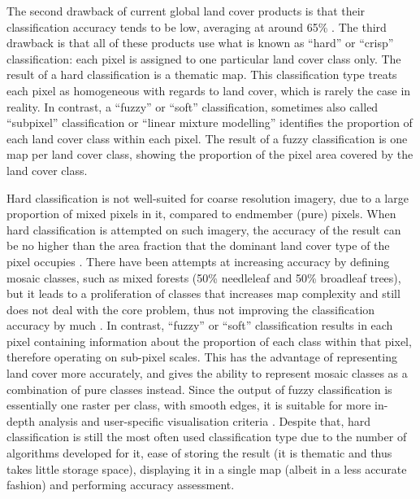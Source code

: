 \documentclass[a4paper,12pt]{scrbook}
\begin{document}
The second drawback of current global land cover products is that their classification accuracy tends to be low, averaging at around 65\% \citep{tsendbazar2016integrating}. The third drawback is that all of these products use what is known as ``hard'' or ``crisp'' classification: each pixel is assigned to one particular land cover class only. The result of a hard classification is a thematic map. This classification type treats each pixel as homogeneous with regards to land cover, which is rarely the case in reality. In contrast, a ``fuzzy'' or ``soft'' classification, sometimes also called ``subpixel'' classification or ``linear mixture modelling'' \citep{Okeke2006fuzzyexponent} identifies the proportion of each land cover class within each pixel. The result of a fuzzy classification is one map per land cover class, showing the proportion of the pixel area covered by the land cover class.

Hard classification is not well-suited for coarse resolution imagery, due to a large proportion of mixed pixels in it, compared to endmember (pure) pixels. When hard classification is attempted on such imagery, the accuracy of the result can be no higher than the area fraction that the dominant land cover type of the pixel occupies \citep{latifovic2004accuracy}. There have been attempts at increasing accuracy by defining mosaic classes, such as mixed forests (50\% needleleaf and 50\% broadleaf trees), but it leads to a proliferation of classes that increases map complexity and still does not deal with the core problem, thus not improving the classification accuracy by much \citep{tsendbazar2016comparative}. In contrast, ``fuzzy'' or ``soft'' classification results in each pixel containing information about the proportion of each class within that pixel, therefore operating on sub-pixel scales. This has the advantage of representing land cover more accurately, and gives the ability to represent mosaic classes as a combination of pure classes instead. Since the output of fuzzy classification is essentially one raster per class, with smooth edges, it is suitable for more in-depth analysis and user-specific visualisation criteria \citep{tsendbazar2016integrating}. Despite that, hard classification is still the most often used classification type due to the number of algorithms developed for it, ease of storing the result (it is thematic and thus takes little storage space), displaying it in a single map (albeit in a less accurate fashion) and performing accuracy assessment.
\end{document}

